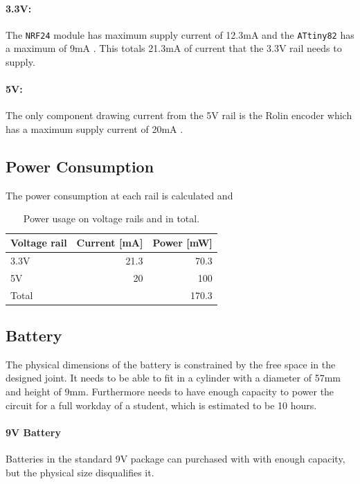 \paragraph{3.3V:}
\label{par:3_3v}
The \texttt{NRF24} module has maximum supply current of 12.3mA \cite{NFR24L01} and the \texttt{ATtiny82} has a maximum of 9mA \cite{attiny84}.
This totals 21.3mA of current that the 3.3V rail needs to supply.

\paragraph{5V:}
\label{par:5v}
The only component drawing current from the 5V rail is the Rolin encoder which has a maximum supply current of 20mA \cite{RLBD01}.

\subsection{Power Consumption} 
\label{subsub:power_consumption}
The power consumption at each rail is calculated and 

\begin{table}
	\centering
	\begin{tabular}{l|r|r}
		 Voltage rail 	& Current [mA] 	& Power [mW]\\
		 \hline
		 3.3V 			& 21.3			&70.3		\\
		 5V  			& 20 			&100		\\
		 \hline
		 Total 			& 				&170.3		
	\end{tabular}
	\caption{Power usage on voltage rails and in total.}
	\label{tab:power_joint}
\end{table}

\subsection{Battery}
\label{subsub:battery}
The physical dimensions of the battery is constrained by the free space in the designed joint.
It needs to be able to fit in a cylinder with a diameter of 57mm and height of 9mm.
Furthermore needs to have enough capacity to power the circuit for a full workday of a student, which is estimated to be 10 hours.

\paragraph{9V Battery}
Batteries in the standard 9V package can purchased with with enough capacity, but the physical size disqualifies it.

